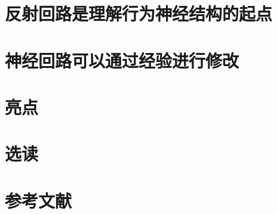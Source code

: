 \section{反射回路是理解行为神经结构的起点}

\section{神经回路可以通过经验进行修改}


\section{亮点}

\section{选读}

\section{参考文献}












